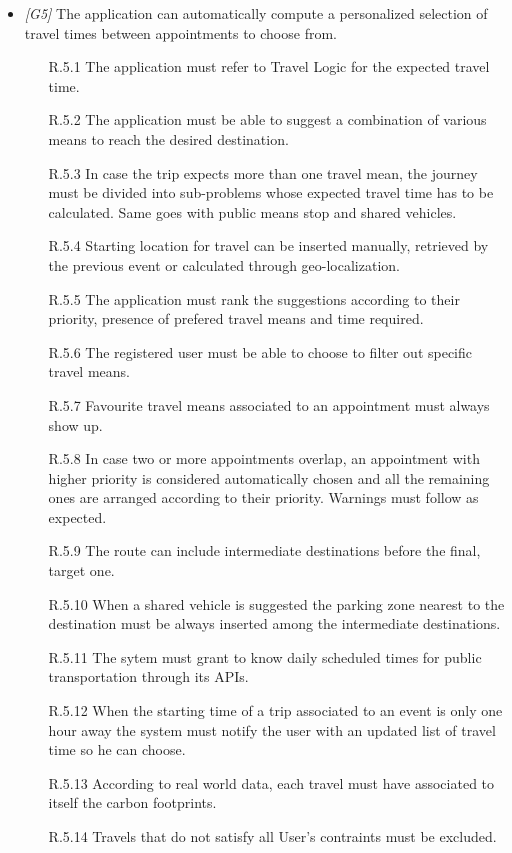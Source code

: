 \begin{itemize}
	\item \textit{[G5]} The application can automatically compute a personalized selection of travel times between appointments to choose from.
		\begin{itemize}
			\item [R.5.1] The application must refer to Travel Logic for the expected travel time.
			\item [R.5.2] The application must be able to suggest a combination of various means to reach the desired destination.
			\item [R.5.3] In case the trip expects more than one travel mean, the journey must be divided into sub-problems whose expected travel time has to be calculated. Same goes with public means stop and shared vehicles.
			\item [R.5.4] Starting location for travel can be inserted manually, retrieved by the previous event or calculated through geo-localization.
			\item [R.5.5] The application must rank the suggestions according to their priority, presence of prefered travel means and time required.
			\item [R.5.6] The registered user must be able to choose to filter out specific travel means.
			\item [R.5.7] Favourite travel means associated to an appointment must always show up.
			\item [R.5.8] In case two or more appointments overlap, an appointment with higher priority is considered automatically chosen and all the remaining ones are arranged according to their priority. Warnings must follow as expected.
			\item [R.5.9] The route can include intermediate destinations before the final, target one.
			\item [R.5.10] When a shared vehicle is suggested the parking zone nearest to the destination must be always inserted among the intermediate destinations.
			\item [R.5.11] The sytem must grant to know daily scheduled times for public transportation through its APIs.
			\item [R.5.12] When the starting time of a trip associated to an event is only one hour away the system must notify the user with an updated list of travel time so he can choose.
			\item [R.5.13] According to real world data, each travel must have associated to itself the carbon footprints.
			\item [R.5.14] Travels that do not satisfy all User's contraints must be excluded.
			

\end{itemize}
\end{itemize}
